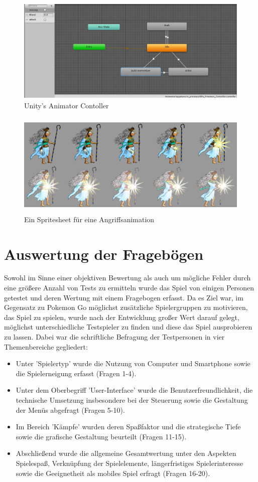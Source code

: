 \documentclass[extern,palatino]{cgBA}
\begin{document}
\begin{figure}[H]
	\centering
	\includegraphics[height=5cm]{animator.jpg}
	\caption{Unity's Animator Contoller}
\end{figure}
\begin{figure}[H]
	\centering
	\includegraphics[height=5cm]{attack.jpg}
	\caption{Ein Spritesheet für eine Angriffsanimation}
\end{figure}
	
\section{Auswertung der Fragebögen}	Sowohl im Sinne einer objektiven Bewertung als auch um mögliche Fehler durch eine größere Anzahl von Tests zu ermitteln wurde das Spiel von einigen Personen getestet und deren Wertung mit einem Fragebogen erfasst. Da es Ziel war, im Gegensatz zu Pokemon Go möglichst zusätzliche Spielergruppen zu motivieren, das Spiel zu spielen, wurde nach der Entwicklung großer Wert darauf gelegt, möglichst unterschiedliche Testspieler zu finden und diese das Spiel ausprobieren zu lassen. Dabei war die schriftliche Befragung der Testpersonen in vier Themenbereiche gegliedert:
\begin{itemize}
	\item Unter 'Spielertyp' wurde die Nutzung von Computer und Smartphone sowie die Spielerneigung erfasst (Fragen 1-4). 
	\item Unter dem Oberbegriff 'User-Interface' wurde die Benutzerfreundlichkeit, die technische Umsetzung insbesondere bei der Steuerung sowie die Gestaltung der Menüs abgefragt (Fragen 5-10).
	\item Im Bereich 'Kämpfe' wurden deren Spaßfaktor und die strategische Tiefe sowie die grafische Gestaltung beurteilt (Fragen 11-15).
	\item Abschließend wurde die allgemeine Gesamtwertung unter den Aspekten Spielespaß, Verknüpfung der Spielelemente, längerfristiges Spielerinteresse sowie die Geeignetheit als mobiles Spiel erfragt (Fragen 16-20).
\end{itemize}
\end{document}
